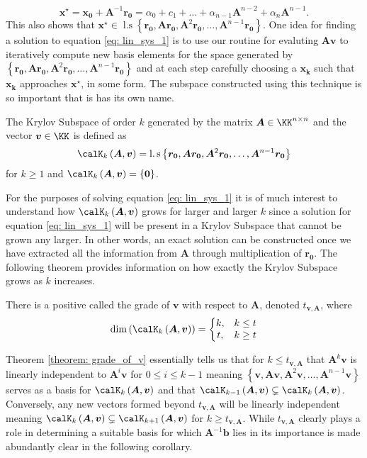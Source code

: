 \[
    \bm{x^{\star}} = \bm{x_0} + \bm{A}^{-1} \bm{r_0} = \alpha_0 + c_1 + \ldots + \alpha_{n-1} \bm{A}^{n-2} + \alpha_{n} \bm{A}^{n-1}.
\]
This also shows that $\bm{x^{\star}} \in \operatorname{l.s} \left\{ \bm{r_0}, \bm{A} \bm{r_0}, \bm{A}^2 \bm{r_0}, \ldots , \bm{A}^{n-1} \bm{r_0} \right\}$. One idea for finding a solution to equation \ref{eq: lin_sys_1} is to use our routine for evaluting $\bm{A} \bm{v}$ to iteratively compute new basis elements for the space generated by $\left\{ \bm{r_0}, \bm{A} \bm{r_0}, \bm{A}^2 \bm{r_0}, \ldots , \bm{A}^{n-1} \bm{r_0} \right\}$ and at each step carefully choosing a $\bm{x_k}$ such that $\bm{x_k}$ approaches $\bm{x^{\star}}$, in some form. The subspace constructed using this technique is so important that is has its own name.
\begin{defe} \label{defe: krylov_subspace}
    The Krylov Subspace of order $k$ generated by the matrix $\bm{A} \in \KK^{n \times n}$ and the vector $\bm{v} \in \KK$ is defined as
    \[
        \calK_{k} \left( \bm{A},\bm{v} \right) = \operatorname{l.s} \left\{ \bm{r_0}, \bm{A} \bm{r_0}, \bm{A}^2 \bm{r_0}, \ldots , \bm{A}^{n-1} \bm{r_0} \right\}
    \]
    for $k \geq 1$ and $\calK_{k} \left( \bm{A},\bm{v} \right) = \left\{ \bm{0} \right\}$.
\end{defe}
For the purposes of solving equation \ref{eq: lin_sys_1} it is of much interest to understand how $\calK_{k} \left( \bm{A},\bm{v} \right)$ grows for larger and larger $k$ since a solution for equation \ref{eq: lin_sys_1} will be present in a Krylov Subspace that cannot be grown any larger. In other words, an exact solution can be constructed once we have extracted all the information from $\bm{A}$ through multiplication of $\bm{r_0}$. The following theorem provides information on how exactly the Krylov Subspace grows as $k$ increases.
\begin{thm} \label{theorem: grade_of_v}
    There is a positive called the grade of $\bm{v}$ with respect to $\bm{A}$, denoted $t_{\bm{v}, \bm{A}}$, where
    \[
        \operatorname{dim} \left( \calK_{k} \left( \bm{A} , \bm{v} \right) \right) = \left\{
        \begin{matrix}
            k, & k \leq t \\
            t, & k \geq t
        \end{matrix}
        \right.
    \]
\end{thm}
Theorem \ref{theorem: grade_of_v} essentially tells us that for $k \leq t_{\bm{v}, \bm{A}}$ that $\bm{A}^k \bm{v}$ is linearly independent to $\bm{A}^i \bm{v}$ for $0 \leq i \leq k-1$ meaning $\left\{ \bm{v}, \bm{A} \bm{v}, \bm{A}^2 \bm{v}, \ldots , \bm{A}^{n-1} \bm{v} \right\}$ serves as a basis for $\calK_{k} \left( \bm{A},\bm{v} \right)$ and that $\calK_{k-1} \left( \bm{A},\bm{v} \right) \subsetneq \calK_{k} \left( \bm{A},\bm{v} \right)$. Conversely, any new vectors formed beyond $t_{\bm{v}, \bm{A}}$ will be linearly independent meaning $\calK_{k} \left( \bm{A},\bm{v} \right) \subsetneq \calK_{k+1} \left( \bm{A},\bm{v} \right)$ for $k \geq t_{\bm{v}, \bm{A}}$. While $t_{\bm{v}, \bm{A}}$ clearly plays a role in determining a suitable basis for which $\bm{A}^{-1} \bm{b}$ lies in its importance is made abundantly clear in the following corollary.
